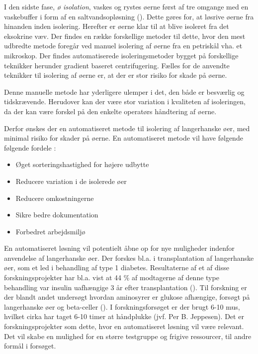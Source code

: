 I den sidste fase, \textit{ø isolation}, vaskes og rystes øerne først af tre omgange med en vaskebuffer i form af en saltvandsopløsning (\cite{hbbs}). Dette gøres for, at løsrive øerne fra hinanden inden isolering. Herefter er øerne klar til at blive isoleret fra det eksokrine væv. Der findes en række forskellige metoder til dette, hvor den mest udbredte metode foregår ved manuel isolering af øerne fra en petriskål vha. et mikroskop. Der findes automatiserede isoleringsmetoder bygget på forskellige teknikker herunder gradient baseret centrifugering. Fælles for de anvendte teknikker til isolering af øerne er, at der er stor risiko for skade på øerne. 

Denne manuelle metode har yderligere ulemper i det, den både er besværlig og tidskrævende. Herudover kan der være stor variation i kvaliteten af isoleringen, da der kan være forskel på den enkelte operatørs håndtering af øerne. 

Derfor ønskes der en automatiseret metode til isolering af langerhanske øer, med minimal risiko for skader på øerne. En automatiseret metode vil have følgende følgende fordele \cite{pptintro}: 

\begin{itemize}
\item Øget sorteringshastighed for højere udbytte
\item Reducere variation i de isolerede øer
\item Reducere omkostningerne
\item Sikre bedre dokumentation
\item Forbedret arbejdsmiljø
\end{itemize} 

En automatiseret løsning vil potentielt åbne op for nye muligheder indenfor anvendelse af langerhanske øer. Der forskes bl.a. i transplantation af langerhanske øer, som et led i behandling af type 1 diabetes. Resultaterne af et af disse forskningsprojekter har bl.a. vist at 44 \% af modtagerne af denne type behandling var insulin uafhængige 3 år efter transplantation (\cite{islettransplantation}). Til forskning er der blandt andet undersøgt hvordan aminosyrer er glukose afhængige, forsøgt på langerhanske øer og beta-celler (\cite{aminosyre}). I forskningsforsøget er der brugt 6-10 mus, hvilket cirka har taget 6-10 timer at håndplukke (jvf. Per B. Jeppesen). Det er forskningsprojekter som dette, hvor en automatiseret løsning vil være relevant. Det vil skabe en mulighed for en større testgruppe og frigive ressourcer, til andre formål i forsøget.

